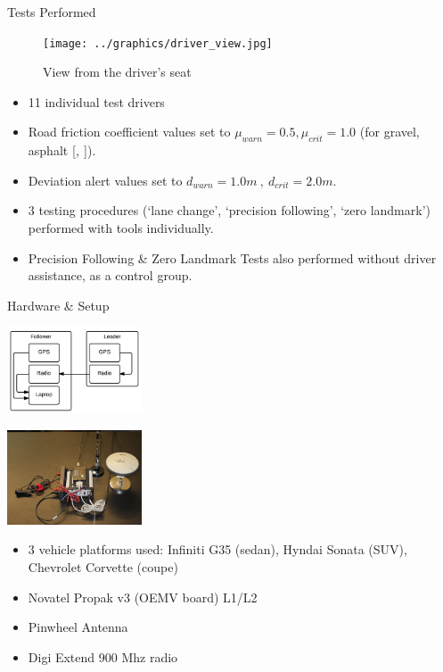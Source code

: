 \documentclass{beamer}
\newcommand{\citeitem}[1]{[\emph{\Citeauthor*{#1}, \citeyear{#1} }]}
\begin{document}
  \begin{frame}{Tests Performed}
    \begin{figure}[ht] \centering
      \texttt{[image: ../graphics/driver\_view.jpg]}
      \caption{\scriptsize View from the driver's seat}
    \end{figure}
    \vspace{-20pt}
    \begin{itemize} \scriptsize
      \item 11 individual test drivers
      \item Road friction coefficient values set to $\mu_{warn}=0.5,\mu_{crit}=1.0$ (for gravel, asphalt \citeitem{mu}).
      \item Deviation alert values set to $d_{warn}=1.0m~,~d_{crit}=2.0m$.
      \item 3 testing procedures (`lane change', `precision following', `zero landmark') performed with tools individually.
      \item Precision Following \& Zero Landmark Tests also performed without driver assistance, as a control group.
    \end{itemize}
  \end{frame}

  \begin{frame}{Hardware \& Setup}
      \begin{minipage}{0.45\textwidth}
        \centering
        \includegraphics[width=4cm]{../graphics/hardware_flow.png}
      \end{minipage}
      \begin{minipage}{0.45\textwidth}
        \centering
        \includegraphics[width=4cm]{../graphics/lead_hardware.jpg}
      \end{minipage}
      \begin{itemize}
        \item 3 vehicle platforms used: Infiniti G35 (sedan), Hyndai Sonata (SUV), Chevrolet Corvette (coupe)
        \item Novatel Propak v3 (OEMV board) L1/L2
        \item Pinwheel Antenna
        \item Digi Extend 900 Mhz radio
      \end{itemize}
  \end{frame}
\end{document}
